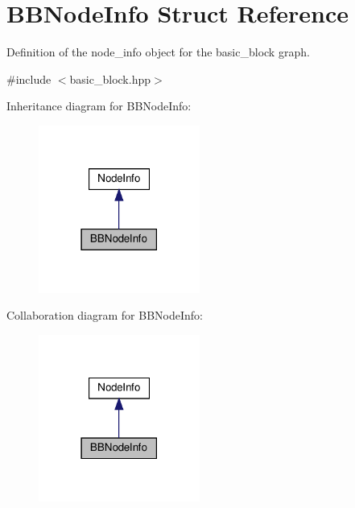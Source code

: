 \hypertarget{structBBNodeInfo}{}\section{B\+B\+Node\+Info Struct Reference}
\label{structBBNodeInfo}


Definition of the node\+\_\+info object for the basic\+\_\+block graph.  




{\ttfamily \#include $<$basic\+\_\+block.\+hpp$>$}



Inheritance diagram for B\+B\+Node\+Info\+:
\nopagebreak
\begin{figure}[H]
\begin{center}
\leavevmode
\includegraphics[width=150pt]{da/d3e/structBBNodeInfo__inherit__graph}
\end{center}
\end{figure}


Collaboration diagram for B\+B\+Node\+Info\+:
\nopagebreak
\begin{figure}[H]
\begin{center}
\leavevmode
\includegraphics[width=150pt]{d4/d31/structBBNodeInfo__coll__graph}
\end{center}
\end{figure}
